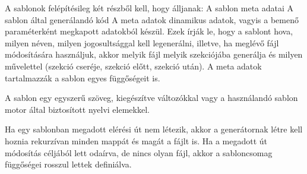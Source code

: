 \documentclass[a4paper,12pt,oneside]{report}
\begin{document}
\begin{justify}
	A sablonok felépítésileg két részből kell, hogy álljanak:
	A sablon meta adatai
	A sablon által generálandó kód
	A meta adatok dinamikus adatok, vagyis a bemenő paraméterként megkapott adatokból készül. Ezek írják le, hogy a sablont hova, milyen néven, milyen jogosultsággal kell legenerálni, illetve, ha meglévő fájl módosítására használjuk, akkor melyik fájl melyik szekciójába generálja és milyen művelettel (szekció cseréje, szekció előtt, szekció után). A meta adatok tartalmazzák a sablon egyes függőségeit is. 

	A sablon egy egyszerű szöveg, kiegészítve változókkal vagy a használandó sablon motor által biztosított nyelvi elemekkel.

	Ha egy sablonban megadott elérési út nem létezik, akkor a generátornak létre kell hoznia rekurzívan minden mappát és magát a fájlt is. Ha a megadott út módosítás céljából lett odaírva, de nincs olyan fájl, akkor a sabloncsomag függőségei rosszul lettek definiálva.

\end{justify}

\newpage
\end{document}
